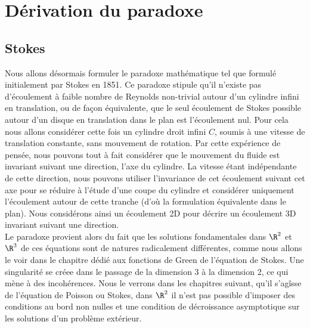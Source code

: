 \section{Dérivation du paradoxe}

\subsection{Stokes}

Nous allons désormais formuler le paradoxe mathématique tel que formulé initialement par Stokes en 1851. Ce paradoxe stipule qu'il n'existe pas d'écoulement à faible nombre de Reynolds non-trivial autour d'un cylindre infini en translation, ou de façon équivalente, que le seul écoulement de Stokes possible autour d'un disque en translation dans le plan est l'écoulement nul.
Pour cela nous allons considérer cette fois un cylindre droit infini $C$, soumis à une vitesse de translation constante, sans mouvement de rotation. Par cette expérience de pensée, nous pouvons tout à fait considérer que le mouvement du fluide est invariant suivant une direction, l'axe du cylindre. La vitesse étant indépendante de cette direction, nous
pouvons utiliser l'invariance de cet écoulement suivant cet axe pour se réduire à l'étude d'une coupe du cylindre et considérer uniquement l'écoulement autour de cette tranche (d'où la formulation équivalente dans le plan). Nous considérons ainsi un écoulement 2D pour décrire un écoulement 3D invariant suivant une direction. \\
Le paradoxe provient alors du fait que les solutions fondamentales dans $\R^2$ et $\R^3$ de ces équations sont de natures radicalement différentes, comme nous allons le voir dans le chapitre dédié aux fonctions de Green de l'équation de Stokes. Une singularité se créee dans le passage de la dimension 3 à la dimension 2, ce qui mène à des incohérences. 
Nous le verrons dans les chapitres suivant, qu'il s'agîsse de l'équation de Poisson ou Stokes, dans $\R^2$ il n'est pas possible d'imposer des conditions au bord non nulles et une condition de décroissance asymptotique sur les solutions d'un problème extérieur.

\vspace{1em}

